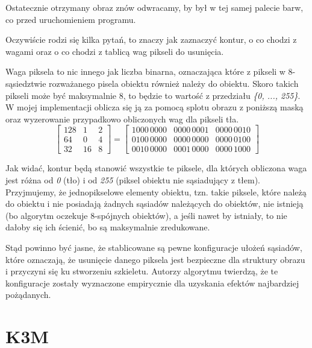 \documentclass[11pt]{article}
\begin{document}
Ostatecznie otrzymany obraz znów odwracamy, by był w tej samej palecie barw, co przed uruchomieniem programu.
\par
Oczywiście rodzi się kilka pytań, to znaczy jak zaznaczyć kontur, o co chodzi z wagami oraz o co chodzi z tablicą wag pikseli do usunięcia.
\par
Waga piksela to nic innego jak liczba binarna, oznaczająca które z pikseli w 8-sąsiedztwie rozważanego pisela obiektu również należy do obiektu. Skoro takich pikseli może być maksymalnie 8, to będzie to wartość z przedziału \textit{\{0, ..., 255\}}. W mojej implementacji oblicza się ją za pomocą splotu obrazu z poniższą maską oraz wyzerowanie przypadkowo obliczonych wag dla pikseli tła.
\[ \begin{bmatrix}
128 & 1 & 2 \\
64 & 0 & 4 \\
32 & 16 & 8
\end{bmatrix} = \begin{bmatrix}
1000\,0000 & 0000\,0001 & 0000\,0010 \\
0100\,0000 & 0000\,0000 & 0000\,0100 \\
0010\,0000 & 0001\,0000 & 0000\,1000
\end{bmatrix}\]
\par
Jak widać, kontur będą stanowić wszystkie te piksele, dla których obliczona waga jest różna od \textit{0} (tło) i od \textit{255} (piksel obiektu nie sąsiadujący z tłem). Przyjmujemy, że jednopikselowe elementy obiektu, tzn. takie piksele, które należą do obiektu i nie posiadają żadnych sąsiadów należących do obiektów, nie istnieją (bo algorytm oczekuje 8-spójnych obiektów), a jeśli nawet by istniały, to nie dałoby się ich ścienić, bo są maksymalnie zredukowane.
\par
Stąd powinno być jasne, że stablicowane są pewne konfiguracje ułożeń sąsiadów, które oznaczają, że usunięcie danego piksela jest bezpieczne dla struktury obrazu i przyczyni się ku stworzeniu szkieletu. Autorzy algorytmu twierdzą, że te konfiguracje zostały wyznaczone empirycznie dla uzyskania efektów najbardziej pożądanych.



\section{K3M}
\end{document}
